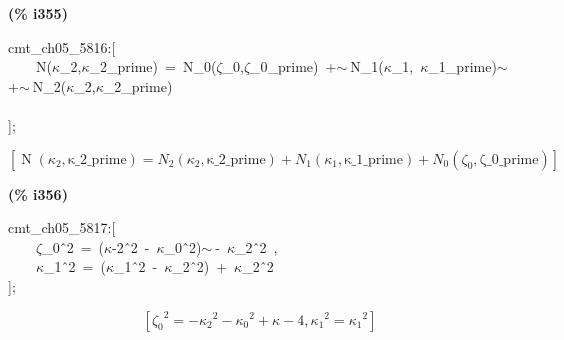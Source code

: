 \documentclass[fleqn]{article}
\begin{document}
\noindent
\begin{minipage}[t]{4.000000em}\color{red}\bfseries
(\% i355)	
\end{minipage}
\begin{minipage}[t]{\textwidth}\color{blue}
cmt\_ch05\_5816:[\\
\ \ \ \ N(\ensuremath{\kappa}\_2,\ensuremath{\kappa}\_2\_prime)\ =\ N\_0(\ensuremath{\zeta}\_0,\ensuremath{\zeta}\_0\_prime)\ +\ensuremath{\sim\ }N\_1(\ensuremath{\kappa}\_1,\ \ensuremath{\kappa}\_1\_prime)\ensuremath{\sim\ }+\ensuremath{\sim\ }N\_2(\ensuremath{\kappa}\_2,\ensuremath{\kappa}\_2\_prime)\\
\\
];
\end{minipage}
\[\displaystyle \tag{\% o355} 
\left[ \operatorname{N}\left( {{\kappa }_2}\operatorname{,}\ensuremath{\mathrm{\kappa \_ 2\_ prime}}\right) ={N_2}\left( {{\kappa }_2}\operatorname{,}\ensuremath{\mathrm{\kappa \_ 2\_ prime}}\right) +{N_1}\left( {{\kappa }_1}\operatorname{,}\ensuremath{\mathrm{\kappa \_ 1\_ prime}}\right) +{N_0}\left( {{\zeta }_0}\operatorname{,}\ensuremath{\mathrm{\zeta \_ 0\_ prime}}\right) \right] \mbox{}
\]


\noindent
\begin{minipage}[t]{4.000000em}\color{red}\bfseries
(\% i356)	
\end{minipage}
\begin{minipage}[t]{\textwidth}\color{blue}
cmt\_ch05\_5817:[\\
\ \ \ \ \ensuremath{\zeta}\_0\^\ 2\ =\ (\ensuremath{\kappa}-2\^\ 2\ -\ \ensuremath{\kappa}\_0\^\ 2)\ensuremath{\sim\ }-\ \ensuremath{\kappa}\_2\^\ 2\ ,\ \\
\ \ \ \ \ensuremath{\kappa}\_1\^\ 2\ =\ (\ensuremath{\kappa}\_1\^\ 2\ -\ \ensuremath{\kappa}\_2\^\ 2)\ +\ \ensuremath{\kappa}\_2\^\ 2\\
];
\end{minipage}
\[\displaystyle \tag{\% o356} 
\left[ {{{{\zeta }_0}}^{2}}=-{{{{\kappa }_2}}^{2}}-{{{{\kappa }_0}}^{2}}+\kappa -4\operatorname{,}{{{{\kappa }_1}}^{2}}={{{{\kappa }_1}}^{2}}\right] \mbox{}
\]
\end{document}
